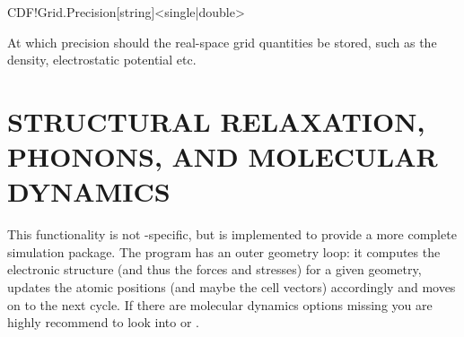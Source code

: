 \begin{fdfentry}{CDF!Grid.Precision}[string]<single|double>

  At which precision should the real-space grid quantities be stored,
  such as the density, electrostatic potential etc.
  
\end{fdfentry}



\vspace{5pt}
\section{STRUCTURAL RELAXATION, PHONONS, AND MOLECULAR DYNAMICS}

This functionality is not \siesta-specific, but is implemented to
provide a more complete simulation package. The program has an outer
geometry loop: it computes the electronic structure (and
thus the forces and stresses) for a given geometry, updates the
atomic positions (and maybe the cell vectors) accordingly and moves on
to the next cycle.
%
If there are molecular dynamics options missing you are highly
recommend to look into  or
. 


